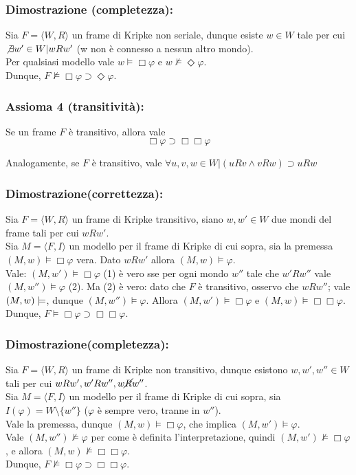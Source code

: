\subsubsection{Dimostrazione (completezza):}
Sia $F = \langle W, R \rangle$ un frame di Kripke non seriale, dunque esiste $w \in W$ tale per cui $\not \exists w' \in W | wRw'$ (w non è connesso a nessun altro mondo).\\
Per qualsiasi modello vale $w \models \Box \varphi$ e $w \not \models \Diamond \varphi$.\\
Dunque, $F \not \models \Box \varphi \supset \Diamond \varphi$.

\subsubsection{Assioma 4 (transitività):} Se un frame $F$ è transitivo, allora vale $$\Box \varphi \supset \Box \Box \varphi$$

Analogamente, se $F$ è transitivo, vale $\forall u, v, w \in W  | (uRv \land vRw) \supset uRw$

\subsubsection{Dimostrazione(correttezza):}
Sia $F = \langle W, R \rangle$ un frame di Kripke transitivo, siano $w, w' \in W$ due mondi del frame tali per cui $wRw'$.\\
Sia $M = \langle F, I \rangle$ un modello per il frame di Kripke di cui sopra, sia la premessa $(M, w) \models \Box \varphi$ vera. Dato $wRw'$ allora $(M, w) \models \varphi$.\\
Vale: $(M, w') \models \Box \varphi$ (1) è vero sse per ogni mondo $w''$ tale che $w'Rw''$ vale $(M, w'') \models \varphi$ (2). Ma (2) è vero: dato che $F$ è transitivo, osservo che $wRw''$; vale $(M, w) \models \box \varphi$, dunque $(M, w'') \models \varphi$. Allora $(M, w') \models \Box \varphi$ e $(M, w) \models \Box \Box \varphi$.\\
Dunque, $F \models \Box \varphi \supset \Box \Box \varphi$.

\subsubsection{Dimostrazione(completezza):}
Sia $F = \langle W, R \rangle$ un frame di Kripke non transitivo, dunque esistono $w, w', w'' \in W$ tali per cui $wRw', w'Rw'', w\cancel{R}w''$.\\
Sia $M = \langle F, I \rangle$ un modello per il frame di Kripke di cui sopra, sia $I(\varphi) = W \setminus \{w''\}$ ($\varphi$ è sempre vero, tranne in $w''$).\\
Vale la premessa, dunque $(M, w) \models \Box \varphi$, che implica $(M, w') \models \varphi$.\\
Vale $(M, w'') \not \models \varphi$ per come è definita l'interpretazione, quindi $(M, w') \not \models \Box \varphi$, e allora $(M, w) \not \models \Box \Box \varphi$.\\
Dunque, $F \not \models \Box \varphi \supset \Box \Box \varphi$.

